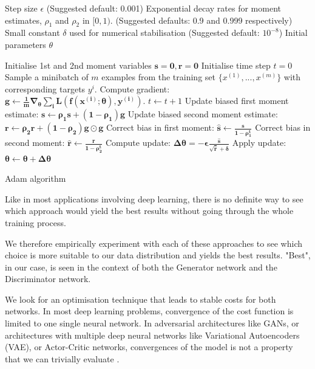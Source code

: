 \begin{algorithm}[ht]
\begin{algorithmic}
    Step size $\epsilon$ (Suggested default: 0.001)
    Exponential decay rates for moment estimates, $\rho_1$ and $\rho_2$ in $[0,1)$. (Suggested defaults: 0.9 and 0.999 respectively)
    Small constant $\delta$ used for numerical stabilisation (Suggested default: $10^{-8}$)
    Initial parameters $\theta$
   
   \STATE Initialise 1st and 2nd moment variables $\mathbf{s=0, r=0}$
   \STATE Initialise time step $t=0$
   \STATE Sample a minibatch of $m$ examples from the training set $\{x^{(1)},...,x^{(m)}\}$ with corresponding targets $y^{i}$.
   \STATE Compute gradient: $\boldsymbol{g \leftarrow \frac{1}{m}\nabla_\theta \sum_i L(f(x^{(i)}; \theta), y^{(i)}).}$
   \STATE $t \leftarrow t + 1$
   \STATE Update biased first moment estimate: $\boldsymbol{s \leftarrow \rho_1 s + (1-\rho_1) g}$
   \STATE Update biased second moment estimate: $\boldsymbol{r \leftarrow \rho_2 r + (1-\rho_2) g \odot g}$
   \STATE Correct bias in first moment: $\boldsymbol{\hat{s} \leftarrow \frac{s}{1-\rho_1^t}}$
   \STATE Correct bias in second moment: $\boldsymbol{\hat{r} \leftarrow \frac{r}{1-\rho_2^t}}$
   \STATE Compute update: $\boldsymbol{\Delta \theta = -\epsilon \frac{\hat{s}}{\sqrt{\hat{r}} + \delta}}$
   \STATE Apply update: $\boldsymbol{\theta \leftarrow \theta + \Delta \theta}$
   \ENDWHILE
\end{algorithmic}
  \caption{Adam algorithm}
  \label{alg:Adam}
\end{algorithm}

Like in most applications involving deep learning, there is no definite way to see which approach would yield the best results without going through the whole training process.

We therefore empirically experiment with each of these approaches to see which choice is more suitable to our data distribution and yields the best results. "Best", in our case, is seen in the context of both the Generator network and the Discriminator network.

We look for an optimisation technique that leads to stable costs for both networks. In most deep learning problems, convergence of the cost function is limited to one single neural network. In adversarial architectures like GANs, or architectures with multiple deep neural networks like Variational Autoencoders (VAE), or Actor-Critic networks, convergences of the model is not a property that we can trivially evaluate \citep{kingma2013auto, grondman2012survey}.


